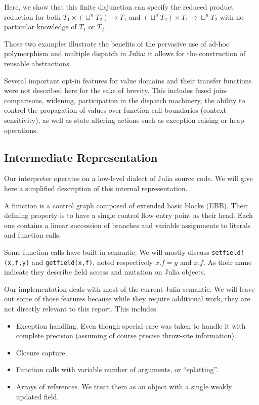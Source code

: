 \documentclass[11pt]{article}
\begin{document}
Here, we show that this finite disjunction can specify the reduced product reduction for both $T_1\times\left(\sqcup^nT_2\right)\to T_1$ and $\left(\sqcup^nT_2\right)\times T_1 \to \sqcup^nT_2$ with no particular knowledge of $T_1$ or $T_2$.

Those two examples illustrate the benefits of the pervasive use of ad-hoc polymorphism and multiple dispatch in Julia: it allows for the construction of reusable abstractions.

Several important opt-in features for value domains and their transfer functions were not described here for the sake of brevity. This includes fused join-comparisons, widening, participation in the dispatch machinery, the ability to control the propagation of values over function call boundaries (context sensitivity), as well as state-altering actions such as exception raising or heap operations.

\subsection*{Intermediate Representation}

Our interpreter operates on a low-level dialect of Julia source code.
We will give here a simplified description of this internal representation.

A function is a control graph composed of extended basic blocks (EBB). Their defining property is to have a single control flow entry point as their head. Each one contains a linear succession of branches and variable assignments to literals and function calls.

Some function calls have built-in semantic. We will mostly discuss \verb~setfield!(x,f,y)~ and \verb~getfield(x,f)~, noted respectively $x.f=y$ and $x.f$.
As their name indicate they describe field access and mutation on Julia objects.

Our implementation deals with most of the current Julia semantic.
We will leave out some of those features because while they require additional work, they are not directly relevant to this report. This includes
\begin{itemize}
\item Exception handling. Even though special care was taken to handle it with complete precision (assuming of course precise throw-site information).
\item Closure capture.
\item Function calls with variable number of arguments, or ``splatting''.
\item Arrays of references. We treat them as an object with a single weakly updated field.
\end{itemize}
\end{document}

